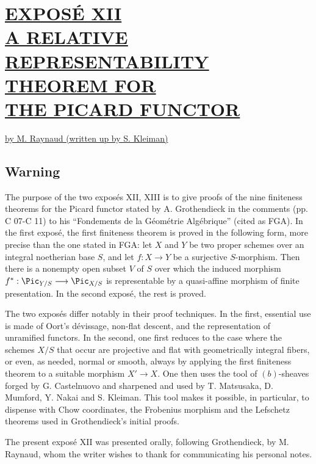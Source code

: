 %
\section*{\underline{EXPOSÉ XII}\\[3pt] \underline{\underline{A RELATIVE REPRESENTABILITY THEOREM FOR}}\\[3pt] \underline{\underline{THE PICARD FUNCTOR}}}
\begin{center}
\underline{by M. Raynaud (written up by S. Kleiman)}
\end{center}

\subsection*{Warning}

The purpose of the two exposés XII, XIII is to give proofs of the nine finiteness theorems for the Picard functor stated by A. Grothendieck in the comments (pp. C 07-C 11) to his ``Fondements de la Géométrie Algébrique'' (cited as FGA). In the first exposé, the first finiteness theorem is proved in the following form, more precise than the one stated in FGA: let \(X\) and \(Y\) be two proper schemes over an integral noetherian base \(S\), and let \(f:X\longrightarrow Y\) be a surjective \(S\)-morphism. Then there is a nonempty open subset \(V\) of \(S\) over which the induced morphism \(f^*:\Pic_{Y/S}\longrightarrow \Pic_{X/S}\) is representable by a quasi-affine morphism of finite presentation. In the second exposé, the rest is proved.

The two exposés differ notably in their proof techniques. In the first, essential use is made of Oort's dévissage, non-flat descent, and the representation of unramified functors. In the second, one first reduces to the case where the schemes \(X/S\) that occur are projective and flat with geometrically integral fibers, or even, as needed, normal or smooth, always by applying the first finiteness theorem to a suitable morphism \(X'\to X\). One then uses the tool of \((b)\)-sheaves forged by G. Castelnuovo and sharpened and used by T. Matsusaka, D. Mumford, Y. Nakai and S. Kleiman. This tool makes it possible, in particular, to dispense with Chow coordinates, the Frobenius morphism and the Lefschetz theorems used in Grothendieck's initial proofs.

The present exposé XII was presented orally, following Grothendieck, by M. Raynaud, whom the writer wishes to thank for communicating his personal notes.


